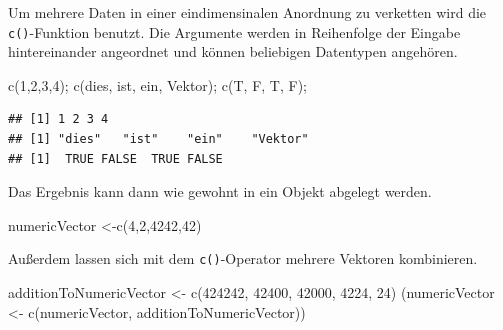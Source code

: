 \documentclass[
]{book}
\newenvironment{Shaded}{\begin{snugshade}}{\end{snugshade}}
\newcommand{\DecValTok}[1]{\textcolor[rgb]{0.00,0.00,0.81}{#1}}
\newcommand{\FunctionTok}[1]{\textcolor[rgb]{0.00,0.00,0.00}{#1}}
\newcommand{\NormalTok}[1]{#1}
\newcommand{\OtherTok}[1]{\textcolor[rgb]{0.56,0.35,0.01}{#1}}
\newcommand{\StringTok}[1]{\textcolor[rgb]{0.31,0.60,0.02}{#1}}
\begin{document}
Um mehrere Daten in einer eindimensinalen Anordnung zu verketten wird die \texttt{c()}-Funktion benutzt.
Die Argumente werden in Reihenfolge der Eingabe hintereinander angeordnet und können beliebigen Datentypen angehören.

\begin{Shaded}
\begin{Highlighting}[]
\FunctionTok{c}\NormalTok{(}\DecValTok{1}\NormalTok{,}\DecValTok{2}\NormalTok{,}\DecValTok{3}\NormalTok{,}\DecValTok{4}\NormalTok{);}
\FunctionTok{c}\NormalTok{(}\StringTok{\textquotesingle{}dies\textquotesingle{}}\NormalTok{, }\StringTok{\textquotesingle{}ist\textquotesingle{}}\NormalTok{, }\StringTok{\textquotesingle{}ein\textquotesingle{}}\NormalTok{, }\StringTok{\textquotesingle{}Vektor\textquotesingle{}}\NormalTok{);}
\FunctionTok{c}\NormalTok{(T, F, T, F);}
\end{Highlighting}
\end{Shaded}

\begin{verbatim}
## [1] 1 2 3 4
## [1] "dies"   "ist"    "ein"    "Vektor"
## [1]  TRUE FALSE  TRUE FALSE
\end{verbatim}

Das Ergebnis kann dann wie gewohnt in ein Objekt abgelegt werden.

\begin{Shaded}
\begin{Highlighting}[]
\NormalTok{numericVector }\OtherTok{\textless{}{-}}\FunctionTok{c}\NormalTok{(}\DecValTok{4}\NormalTok{,}\DecValTok{2}\NormalTok{,}\DecValTok{4242}\NormalTok{,}\DecValTok{42}\NormalTok{)}
\end{Highlighting}
\end{Shaded}

Außerdem lassen sich mit dem \texttt{c()}-Operator mehrere Vektoren kombinieren.

\begin{Shaded}
\begin{Highlighting}[]
\NormalTok{additionToNumericVector }\OtherTok{\textless{}{-}}  \FunctionTok{c}\NormalTok{(}\DecValTok{424242}\NormalTok{, }\DecValTok{42400}\NormalTok{, }\DecValTok{42000}\NormalTok{,}
                               \DecValTok{4224}\NormalTok{, }\DecValTok{24}\NormalTok{)}
\NormalTok{(numericVector }\OtherTok{\textless{}{-}} \FunctionTok{c}\NormalTok{(numericVector, }
\NormalTok{                    additionToNumericVector))}
\end{Highlighting}
\end{Shaded}
\end{document}
